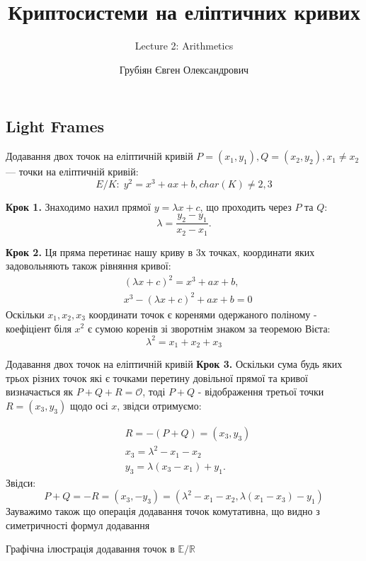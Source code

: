\documentclass[9pt]{beamer}
\title{Криптосистеми на еліптичних кривих} %
\subtitle{Lecture 2: Arithmetics}
\author{Грубіян Євген Олександрович}
\begin{document}
  \frame{\maketitle}


  \begin{darkframes}
      
    \section{Light Frames}

\begin{frame}{Додавання двох точок на еліптичній кривій}
  \(P=(x_1,y_1), Q=(x_2,y_2), x_1\neq x_2\) --- точки на еліптичній кривій:
  \[
  E/K: \; y^2=x^3+ax+b, char(K) \neq 2,3
  \]

  \textbf{Крок 1.} Знаходимо нахил прямої $y=\lambda x + c$, що проходить через \(P\) та \(Q\):
  \[
  \lambda=\frac{y_2-y_1}{x_2-x_1}.
  \]

  \textbf{Крок 2.} Ця пряма перетинає нашу криву в 3х точках, координати яких задовольняють також рівняння кривої:
  \begin{align}
      & (\lambda x + c)^2 = x^3 + ax + b,\\
      & x^3 - (\lambda x + c)^2 + ax + b = 0
  \end{align}
  Оскільки $x_1, x_2, x_3$ координати точок є коренями одержаного поліному - коефіціент біля $x^2$ є сумою коренів зі зворотнім знаком за теоремою Вієта:
  $$
  \lambda^2 = x_1+x_2+x_3
  $$
  
\end{frame}

\begin{frame}{Додавання двох точок на еліптичній кривій}
    \textbf{Крок 3.} Оскільки сума будь яких трьох різних точок які є точками перетину довільної прямої та кривої визначається як $ P+Q+R=\mathcal{O}$, тоді $P+Q$ - відображення третьої точки \(R=(x_3,y_3)\) щодо осі \(x\), звідси отримуємо:

\begin{align}
    & R=-(P+Q)=(x_3,y_3) \\
    & x_3 = \lambda^2-x_1-x_2 \\
    & y_3=\lambda(x_3-x_1)+y_1.
\end{align}
Звідси:
$$
P+Q=-R=(x_3,-y_3)=(\lambda^2-x_1-x_2, \lambda(x_1-x_3)-y_1)
$$
Зауважимо також що операція додавання точок комутативна, що видно з симетричності формул додавання
\end{frame}
\begin{frame}{Графічна ілюстрація додавання точок в $\mathbb{E/R}$}
  \begin{center}
\end{center}
\end{frame}
\end{darkframes}
\end{document}
